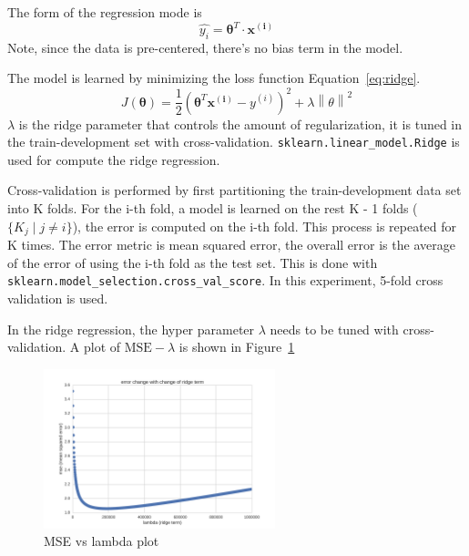 \documentclass[12pt]{article}
\newcommand{\fref}[1]{Figure~\ref{#1}}
\newcommand{\eref}[1]{Equation~\ref{#1}}
\begin{document}
The form of the regression mode is
\begin{equation}
  \label{eq:regression}
  \hat{y_i} = \mathbf{\theta}^T \cdot \mathbf{x^{(i)}}
\end{equation}
Note, since the data is pre-centered, there's no bias term in the
model.

The model is learned by minimizing the loss function \eref{eq:ridge}.
\begin{equation}
  \label{eq:ridge}
  J(\mathbf{\theta}) = \frac{1}{2}(\mathbf{\theta}^T\mathbf{x^{(i)}} - y^{(i)})^2 + \lambda \left\|\theta\right\|^2
\end{equation}
$\lambda$ is the ridge parameter that controls the amount of
regularization, it is tuned in the train-development set with
cross-validation. \texttt{sklearn.linear\_model.Ridge} is used for
compute the ridge regression.

Cross-validation is performed by first partitioning the
train-development data set into K folds. For the i-th fold, a model is
learned on the rest K - 1 folds ($\{K_j \mid j \neq i\}$), the error
is computed on the i-th fold. This process is repeated for K
times. The error metric is mean squared error, the overall error is
the average of the error of using the i-th fold as the test set. This
is done with \texttt{sklearn.model\_selection.cross\_val\_score}. In
this experiment, 5-fold cross validation is used.

In the ridge regression, the hyper parameter $\lambda$ needs to be
tuned with cross-validation. A plot of $\text{MSE} - \lambda$ is shown
in \fref{fig:cv_5_fold_ridge}
\begin{figure}[h!]
  \centering
  \includegraphics[width=0.6\textwidth]{images/cv_5_fold_ridge.png}
  \caption{MSE vs lambda plot}
  \label{fig:cv_5_fold_ridge}
\end{figure}
\FloatBarrier
\end{document}
